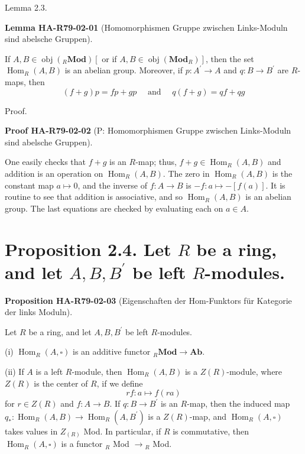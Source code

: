 \documentclass[10pt, letterpaper]{article}
\newcommand{\CustomHeading}[3]{%
  \par\medskip\noindent%
  \textbf{#1 #2} \textnormal{(#3)}.\enskip%
}
\newenvironment{PROP}[2]{\begin{unitbox}\CustomHeading{Proposition}{#1}{#2}}{\end{unitbox}}
\newenvironment{LEM}[2]{\begin{unitbox}\CustomHeading{Lemma}{#1}{#2}}{\end{unitbox}}
\newenvironment{PROOF}[2]{\begin{unitbox}\CustomHeading{Proof}{#1}{#2}}{\end{unitbox}}
\begin{document}
Lemma 2.3. 


\begin{LEM}{HA-R79-02-01}{Homomorphismen Gruppe zwischen Links-Moduln sind abelsche Gruppen}
If $A, B \in \operatorname{obj}\left({ }_{R} \mathbf{M o d}\right)\left[\right.$ or if $\left.A, B \in \operatorname{obj}\left(\mathbf{M o d}_{R}\right)\right]$, then the set $\operatorname{Hom}_{R}(A, B)$ is an abelian group. Moreover, if $p: A^{\prime} \rightarrow A$ and $q: B \rightarrow B^{\prime}$ are $R$-maps, then
$$
(f+g) p=f p+g p \quad \text { and } \quad q(f+g)=q f+q g
$$
\end{LEM}

Proof. 


\begin{PROOF}{HA-R79-02-02}{P: Homomorphismen Gruppe zwischen Links-Moduln sind abelsche Gruppen}
One easily checks that $f+g$ is an $R$-map; thus, $f+g \in \operatorname{Hom}_{R}(A, B)$ and addition is an operation on $\operatorname{Hom}_{R}(A, B)$. The zero in $\operatorname{Hom}_{R}(A, B)$ is the constant map $a \mapsto 0$, and the inverse of $f: A \rightarrow B$ is $-f: a \mapsto-[f(a)]$. It is routine to see that addition is associative, and so $\operatorname{Hom}_{R}(A, B)$ is an abelian group. The last equations are checked by evaluating each on $a \in A$.
\end{PROOF}




\section*{Proposition 2.4. Let $R$ be a ring, and let $A, B, B^{\prime}$ be left $R$-modules.}

\begin{PROP}{HA-R79-02-03}{Eigenschaften der Hom-Funktors für Kategorie der links Moduln}
Let $R$ be a ring, and let $A, B, B^{\prime}$ be left $R$-modules.

(i) $\operatorname{Hom}_{R}(A, \square)$ is an additive functor ${ }_{R} \mathbf{M o d} \rightarrow \mathbf{A b}$.

(ii) If $A$ is a left $R$-module, then $\operatorname{Hom}_{R}(A, B)$ is a $Z(R)$-module, where $Z(R)$ is the center of $R$, if we define
$$
r f: a \mapsto f(r a)
$$
for $r \in Z(R)$ and $f: A \rightarrow B$. If $q: B \rightarrow B^{\prime}$ is an $R$-map, then the induced map $q_{*}: \operatorname{Hom}_{R}(A, B) \rightarrow \operatorname{Hom}_{R}\left(A, B^{\prime}\right)$ is a $Z(R)$-map, and $\operatorname{Hom}_{R}(A, \square)$ takes values in $Z_{(R)}$ Mod. In particular, if $R$ is commutative, then $\operatorname{Hom}_{R}(A, \square)$ is a functor ${ }_{R}$ Mod $\rightarrow{ }_{R}$ Mod.
\end{PROP}
\end{document}
